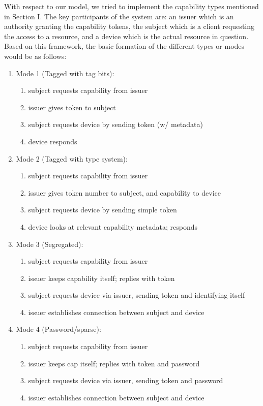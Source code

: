 With respect to our model, we tried to implement the capability types mentioned in Section I. The key participants of the system are: an issuer which is an authority granting the capability tokens, the subject which is a client requesting the access to a resource, and a device which is the actual resource in question. Based on this framework, the basic formation of the different types or modes would be as follows:
\begin{enumerate}
\item Mode 1 (Tagged with tag bits):
	\begin{enumerate}
		\item subject requests capability from issuer
		\item issuer gives token to subject
		\item subject requests device by sending token (w/ metadata)
		\item device responds
	\end{enumerate}
	
\item Mode 2 (Tagged with type system):
	\begin{enumerate}
		\item subject requests capability from issuer
		\item issuer gives token number to subject, and capability to device
		\item subject requests device by sending simple token
		\item device looks at relevant capability metadata; responds
	\end{enumerate}

\item Mode 3 (Segregated):
	\begin{enumerate}
		\item subject requests capability from issuer
		\item issuer keeps capability itself; replies with token
		\item subject requests device via issuer, sending token and identifying itself
		\item issuer establishes connection between subject and device
	\end{enumerate}

\item Mode 4 (Password/sparse):
	\begin{enumerate}
		\item subject requests capability from issuer
		\item issuer keeps cap itself; replies with token and password
		\item subject requests device via issuer, sending token and password
		\item issuer establishes connection between subject and device
	\end{enumerate}
\end{enumerate}

